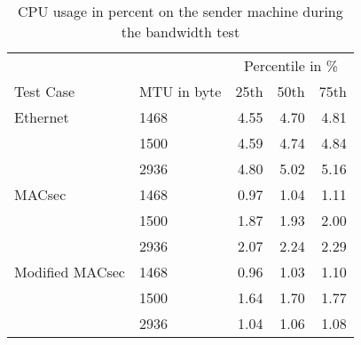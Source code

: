 \begin{table}[h]
  \centering
  \begin{tabular}{llrrr}
    \toprule
    & & \multicolumn{3}{c}{Percentile in \%} \\ \cmidrule(r){3-5}
    Test Case & MTU in byte & 25th & 50th & 75th\\
    \midrule
   Ethernet & 1468 & 4.55& 4.70& 4.81\\
    & 1500& 4.59& 4.74& 4.84\\
    & 2936& 4.80& 5.02& 5.16\\
    MACsec & 1468& 0.97& 1.04& 1.11\\
    & 1500& 1.87& 1.93& 2.00\\
    & 2936& 2.07& 2.24& 2.29\\
    Modified MACsec & 1468& 0.96& 1.03& 1.10\\
    & 1500& 1.64& 1.70& 1.77\\
    & 2936& 1.04& 1.06& 1.08\\
    \bottomrule
  \end{tabular}
  \caption[CPU Usage during bandwidth test]{CPU usage in percent on the sender machine during the bandwidth test}
  \label{tab:cpu-data}
\end{table}
